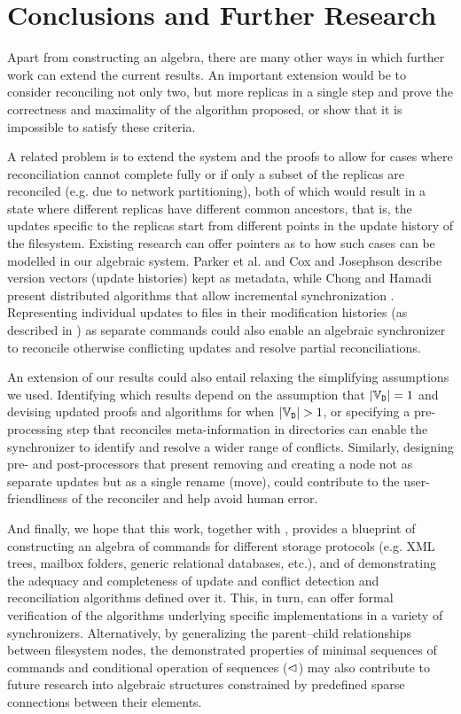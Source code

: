 
\section{Conclusions and Further Research}

Apart from constructing an algebra,
there are many other ways in which further work can extend the current results.
An important extension would be to
consider reconciling not only two, but more replicas in a single step and
prove the correctness and maximality of the algorithm proposed,
or show that it is impossible to satisfy these criteria.

A related problem is to extend the system and the proofs
to allow for cases where reconciliation cannot
complete fully
or if only a subset of the replicas are reconciled 
(e.g. due to network partitioning),
both of which would result in a state where different replicas
have different common ancestors, that is,
the updates specific to the replicas start from different points
in the update history of the filesystem.
Existing research can offer pointers as to how such cases can be modelled
in our algebraic system.
Parker et al. \cite{PPRS} and Cox and Josephson \cite{CJ}
describe version vectors (update histories) kept as metadata,
while Chong and Hamadi present distributed algorithms that allow incremental synchronization \cite{CH}.
Representing individual updates to files
in their modification histories (as described in \cite{CJ})
as separate commands could also enable an algebraic synchronizer to reconcile otherwise
conflicting updates and resolve partial reconciliations.

An extension of our results could also entail relaxing
the simplifying assumptions we used.
Identifying which results depend on the assumption that $|\mathbb{V}_{\mathtt{D}}|=1$
and devising updated proofs and algorithms for when $|\setd|>1$,
or specifying a pre-processing step that reconciles meta-information in directories
can enable the synchronizer
to identify and resolve a wider range of conflicts.
Similarly, designing pre- and post-processors that
present removing and creating a node
not as separate updates but as a single rename (move),
could contribute to the user-friendliness of the reconciler
and help avoid human error.

And finally, we hope that this work, together with \cite{NREC}, provides
a blueprint of constructing an algebra of commands for different storage protocols
(e.g. XML trees, mailbox folders, generic relational databases, etc.),
and of demonstrating the adequacy and completeness of update and conflict detection and reconciliation
algorithms defined over it.
This, in turn, can offer formal verification of the algorithms underlying
specific implementations in a variety of synchronizers.
Alternatively, by generalizing the parent--child relationships between filesystem nodes,
the demonstrated properties of minimal sequences of commands
and conditional operation of sequences ($\vartriangleleft$) %
may also contribute to future research into algebraic structures
constrained by predefined sparse connections between their elements.

